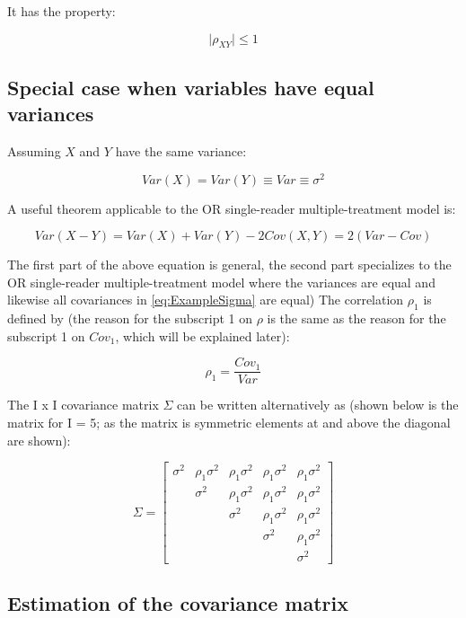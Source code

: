 \documentclass[
]{book}
\begin{document}
It has the property:

\[\mid \rho_{XY} \mid \le 1\]

\hypertarget{special-case-when-variables-have-equal-variances}{%
\subsection{Special case when variables have equal variances}\label{special-case-when-variables-have-equal-variances}}

Assuming \(X\) and \(Y\) have the same variance:

\[Var(X)=Var(Y)\equiv Var\equiv \sigma^2\]

A useful theorem applicable to the OR single-reader multiple-treatment model is:

\begin{equation}
Var(X-Y)=Var(X)+Var(Y)-2Cov(X,Y)=2(Var-Cov)
\label{eq:UsefulTheorem}
\end{equation}

The first part of the above equation is general, the second part specializes to the OR single-reader multiple-treatment model where the variances are equal and likewise all covariances in \eqref{eq:ExampleSigma} are equal) The correlation \(\rho_1\) is defined by (the reason for the subscript 1 on \(\rho\) is the same as the reason for the subscript 1 on \(Cov_1\), which will be explained later):

\[\rho_1=\frac{Cov_1}{Var}\]

The I x I covariance matrix \(\Sigma\) can be written alternatively as (shown below is the matrix for I = 5; as the matrix is symmetric elements at and above the diagonal are shown):

\begin{equation}
\Sigma = 
\begin{bmatrix}
\sigma^2 & \rho_1\sigma^2 & \rho_1\sigma^2 & \rho_1\sigma^2 & \rho_1\sigma^2\\
& \sigma^2 & \rho_1\sigma^2 & \rho_1\sigma^2 & \rho_1\sigma^2\\
&  & \sigma^2 & \rho_1\sigma^2 & \rho_1\sigma^2\\
&  &  & \sigma^2 & \rho_1\sigma^2\\
&  &  &  & \sigma^2
\end{bmatrix}
\label{eq:ExampleSigmaRho}
\end{equation}

\hypertarget{estimation-of-the-covariance-matrix}{%
\subsection{Estimation of the covariance matrix}\label{estimation-of-the-covariance-matrix}}
\end{document}
